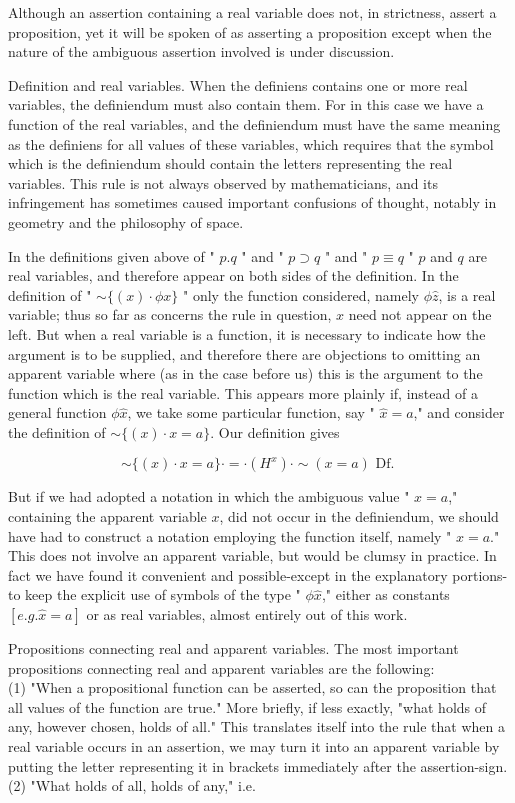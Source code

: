 \documentclass[10pt]{article}
\begin{document}
Although an assertion containing a real variable does not, in strictness, assert a proposition, yet it will be spoken of as asserting a proposition except when the nature of the ambiguous assertion involved is under discussion.

Definition and real variables. When the definiens contains one or more real variables, the definiendum must also contain them. For in this case we have a function of the real variables, and the definiendum must have the same meaning as the definiens for all values of these variables, which requires that the symbol which is the definiendum should contain the letters representing the real variables. This rule is not always observed by mathematicians, and its infringement has sometimes caused important confusions of thought, notably in geometry and the philosophy of space.

In the definitions given above of " $p . q$ " and " $p \supset q$ " and " $p \equiv q$ " $p$ and $q$ are real variables, and therefore appear on both sides of the definition. In the definition of " $\sim\{(x) \cdot \phi x\}$ " only the function considered, namely $\phi \hat{z}$, is a real variable; thus so far as concerns the rule in question, $x$ need not appear on the left. But when a real variable is a function, it is necessary to indicate how the argument is to be supplied, and therefore there are objections to omitting an apparent variable where (as in the case before us) this is the argument to the function which is the real variable. This appears more plainly if, instead of a general function $\phi \hat{x}$, we take some particular function, say " $\hat{x}=a$," and consider the definition of $\sim\{(x) \cdot x=a\}$. Our definition gives

$$
\sim\{(x) \cdot x=a\} \cdot=\cdot\left(H^{x}\right) \cdot \sim(x=a) \text { Df. }
$$

But if we had adopted a notation in which the ambiguous value " $x=a$," containing the apparent variable $x$, did not occur in the definiendum, we should have had to construct a notation employing the function itself, namely " $\hat{x}=a$." This does not involve an apparent variable, but would be clumsy in practice. In fact we have found it convenient and possible-except in the explanatory portions-to keep the explicit use of symbols of the type " $\phi \hat{x}$," either as constants $[e . g . \hat{x}=a]$ or as real variables, almost entirely out of this work.

Propositions connecting real and apparent variables. The most important propositions connecting real and apparent variables are the following:\\
(1) "When a propositional function can be asserted, so can the proposition that all values of the function are true." More briefly, if less exactly, "what holds of any, however chosen, holds of all." This translates itself into the rule that when a real variable occurs in an assertion, we may turn it into an apparent variable by putting the letter representing it in brackets immediately after the assertion-sign.\\
(2) "What holds of all, holds of any," i.e.
\end{document}
